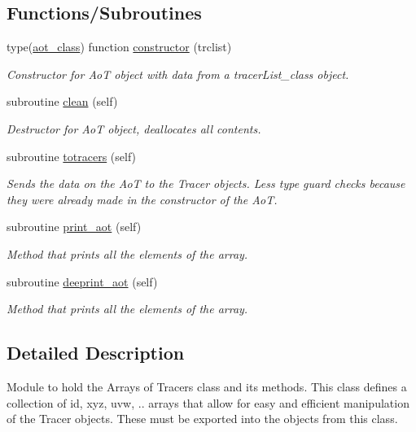 \subsection*{Functions/\+Subroutines}
\begin{DoxyCompactItemize}
\item 
type(\mbox{\hyperlink{structaot__mod_1_1aot__class}{aot\+\_\+class}}) function \mbox{\hyperlink{namespaceaot__mod_a74ce07a020a7470208360766cfdb12df}{constructor}} (trclist)
\begin{DoxyCompactList}\small\item\em Constructor for AoT object with data from a tracer\+List\+\_\+class object. \end{DoxyCompactList}\item 
subroutine \mbox{\hyperlink{namespaceaot__mod_a054fca942c27758a0ad6afaa68a3a08e}{clean}} (self)
\begin{DoxyCompactList}\small\item\em Destructor for AoT object, deallocates all contents. \end{DoxyCompactList}\item 
subroutine \mbox{\hyperlink{namespaceaot__mod_a73ecd8babd54975720741493be733c48}{totracers}} (self)
\begin{DoxyCompactList}\small\item\em Sends the data on the AoT to the Tracer objects. Less type guard checks because they were already made in the constructor of the AoT. \end{DoxyCompactList}\item 
subroutine \mbox{\hyperlink{namespaceaot__mod_aa6ef0ed7c67e66bf04e7aa0070bbde7f}{print\+\_\+aot}} (self)
\begin{DoxyCompactList}\small\item\em Method that prints all the elements of the array. \end{DoxyCompactList}\item 
subroutine \mbox{\hyperlink{namespaceaot__mod_a4affda04a7a0278b350231db9cc4ffb8}{deeprint\+\_\+aot}} (self)
\begin{DoxyCompactList}\small\item\em Method that prints all the elements of the array. \end{DoxyCompactList}\end{DoxyCompactItemize}


\subsection{Detailed Description}
Module to hold the Arrays of Tracers class and its methods. This class defines a collection of id, xyz, uvw, .. arrays that allow for easy and efficient manipulation of the Tracer objects. These must be exported into the objects from this class. 


